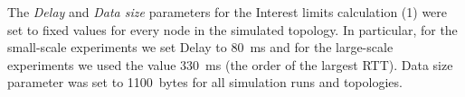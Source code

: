 The \emph{Delay} and \emph{Data size} parameters for the Interest limits calculation (1) were set to fixed values for every node in the simulated topology.
In particular, for the small-scale experiments we set Delay to 80~ms and for the large-scale experiments we used the value 330~ms (the order of the largest RTT).
Data size parameter was set to 1100~bytes for all simulation runs and topologies.





% 

